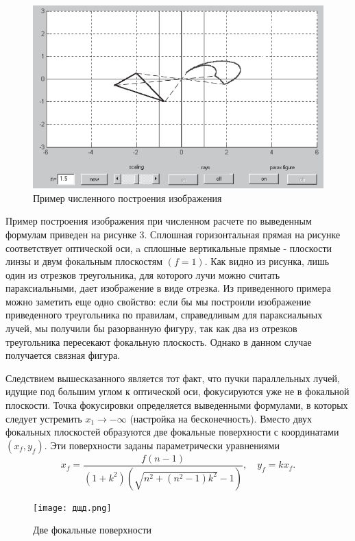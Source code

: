 \documentclass[a4paper,12pt]{article} %
\begin{document}
\begin{figure}[h!]
	\centering
	\includegraphics[scale=1.2]{png.png}
	\caption{Пример численного построения изображения}
\end{figure}

Пример построения изображения при численном расчете по выведенным формулам приведен на рисунке 3. Сплошная горизонтальная прямая на рисунке соответствует оптической оси, a сплошные вертикальные прямые - плоскости линзы и двум фокальным плоскостям $(f=1)$. Как видно из рисунка, лишь один из отрезков треугольника, для которого лучи можно считать параксиальными, дает изображение в виде отрезка. Из приведенного примера можно заметить еще одно свойство: если бы мы построили изображение приведенного треугольника по правилам, справедливым для параксиальных лучей, мы получили бы разорванную фигуру, так как два из отрезков треугольника пересекают фокальную плоскость. Однако в данном случае получается связная фигура.

Следствием вышесказанного является тот факт, что пучки параллельных лучей, идущие под большим углом к оптической оси, фокусируются уже не в фокальной плоскости. Точка фокусировки определяется выведенными формулами, в которых следует устремить $x_{1} \rightarrow-\infty$ (настройка на бесконечность). Вместо двух фокальных плоскостей образуются две фокальные поверхности с координатами $\left(x_{f}, y_{f}\right)$. Эти поверхности заданы параметрически уравнениями
$$
x_{f}=\frac{f(n-1)}{\left(1+k^{2}\right)\left(\sqrt{n^{2}+\left(n^{2}-1\right) k^{2}}-1\right)}, \quad y_{f}=k x_{f} .
$$

\begin{figure}[h!]
	\centering
	\texttt{[image: дщд.png]}
	\caption{Две фокальные поверхности}
\end{figure}
\end{document}
